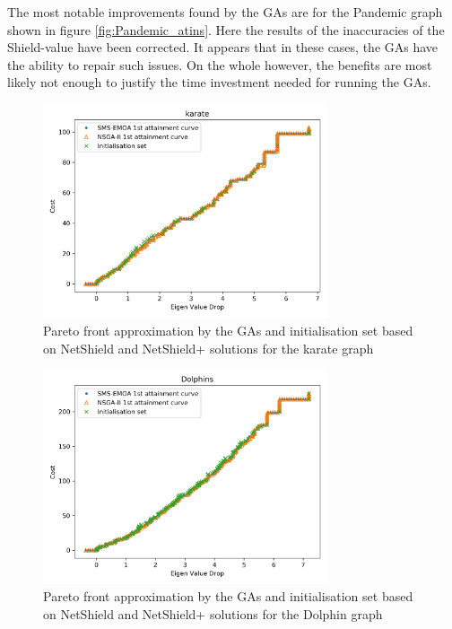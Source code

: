 \documentclass[11pt]{article}
\theoremstyle{definition}
\begin{document}
The most notable improvements found by the GAs are for the Pandemic graph shown in figure \ref{fig:Pandemic_atins}. Here the results of the inaccuracies of the Shield-value have been corrected. It appears that in these cases, the GAs have the ability to repair such issues. On the whole however, the benefits are most likely not enough to justify the time investment needed for running the GAs.

\begin{figure}[h!]
  \centering
    \includegraphics[width=0.75\textwidth]{results_ns_init/karate_attainment_nsinit}
  \caption{Pareto front approximation by the GAs and initialisation set based on NetShield and NetShield+ solutions for the karate graph}
  \label{fig:karate_atins}
\end{figure}

\begin{figure}[h!]
  \centering
    \includegraphics[width=0.75\textwidth]{results_ns_init/dolphins_attainment_nsinit}
  \caption{Pareto front approximation by the GAs and initialisation set based on NetShield and NetShield+ solutions for the Dolphin graph}
  \label{fig:dolphin_atins}
\end{figure}
\end{document}

